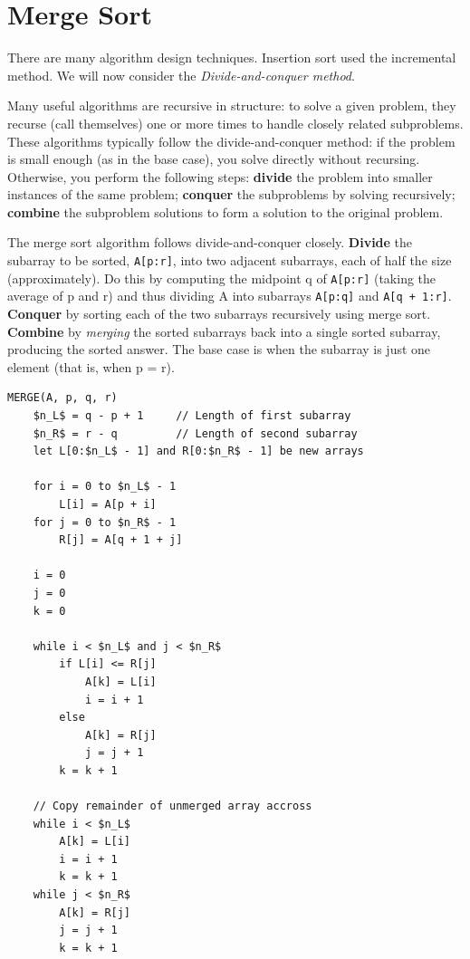 \documentclass[12pt]{article}
\begin{document}
\section{Merge Sort}
There are many algorithm design techniques. Insertion sort used the incremental method. We will now consider
the \textit{Divide-and-conquer method}.

Many useful algorithms are recursive in structure: to solve a given problem, they recurse (call themselves) one
or more times to handle closely related subproblems. These algorithms typically follow the divide-and-conquer method:
if the problem is small enough (as in the base case), you solve directly
without recursing. Otherwise, you perform the following steps: \textbf{divide} the problem into smaller instances
of the same problem; \textbf{conquer} the subproblems by solving recursively; \textbf{combine} the subproblem
solutions to form a solution to the original problem.

The merge sort algorithm follows divide-and-conquer closely. \textbf{Divide} the subarray to be sorted, \texttt{A[p:r]},
into two adjacent subarrays, each of half the size (approximately). Do this by computing the midpoint q of \texttt{A[p:r]}
(taking the average of p and r) and thus dividing A into subarrays \texttt{A[p:q]} and \texttt{A[q + 1:r]}. \textbf{Conquer} by sorting each of
the two subarrays recursively using merge sort. \textbf{Combine} by \textit{merging} the sorted subarrays back into a single sorted subarray, producing the sorted answer.
The base case is when the subarray is just one element (that is, when p = r).
\begin{lstlisting}[mathescape]
    MERGE(A, p, q, r)
    $n_L$ = q - p + 1     // Length of first subarray
    $n_R$ = r - q         // Length of second subarray
    let L[0:$n_L$ - 1] and R[0:$n_R$ - 1] be new arrays

    for i = 0 to $n_L$ - 1
        L[i] = A[p + i]
    for j = 0 to $n_R$ - 1
        R[j] = A[q + 1 + j]

    i = 0
    j = 0
    k = 0

    while i < $n_L$ and j < $n_R$
        if L[i] <= R[j]
            A[k] = L[i]
            i = i + 1
        else
            A[k] = R[j]
            j = j + 1
        k = k + 1

    // Copy remainder of unmerged array accross
    while i < $n_L$
        A[k] = L[i]
        i = i + 1
        k = k + 1
    while j < $n_R$
        A[k] = R[j]
        j = j + 1
        k = k + 1
\end{lstlisting}
\end{document}
